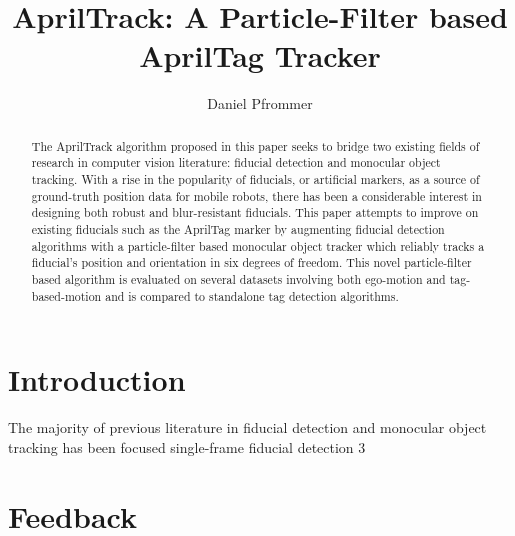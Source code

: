 \documentclass[11pt]{article}
\title{\textbf{AprilTrack: A Particle-Filter based AprilTag Tracker}}
\author{Daniel Pfrommer}
\date{}
\begin{document}
\maketitle

\begin{abstract}

	The AprilTrack algorithm proposed in this paper seeks to bridge two existing fields of research in computer vision literature: fiducial detection and monocular object tracking. With a rise in the popularity of fiducials, or artificial markers, as a source of ground-truth position data for mobile robots, there has been a considerable interest in designing both robust and blur-resistant fiducials. This paper attempts to improve on existing fiducials such as the AprilTag marker by augmenting fiducial detection algorithms with a particle-filter based monocular object tracker which reliably tracks a fiducial's position and orientation in six degrees of freedom. This novel particle-filter based algorithm is evaluated on several datasets involving both ego-motion and tag-based-motion and is compared to standalone tag detection algorithms.
	
\end{abstract}

\section{Introduction}

	The majority of previous literature in fiducial detection and monocular object tracking has been focused single-frame fiducial detection 3


\section{Feedback}
\end{document}
